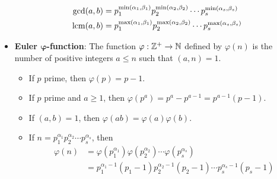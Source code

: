 \documentclass[../main.tex]{subfiles}
\begin{document}
\begin{itemize}
    \begin{align*}
        \gcd(a,b) &= p_1^{\min(\alpha_1,\beta_1)}p_2^{\min(\alpha_2,\beta_2)}\cdots p_s^{\min(\alpha_s,\beta_s)}\\
        \operatorname{lcm}(a,b) &= p_1^{\max(\alpha_1,\beta_1)}p_2^{\max(\alpha_2,\beta_2)}\cdots p_s^{\max(\alpha_s,\beta_s)}
    \end{align*}
    \item \textbf{Euler $\bm{\varphi}$-function}: The function $\varphi:\mathbb{Z}^+\to\mathbb{N}$ defined by $\varphi(n)$ is the number of positive integers $a\leq n$ such that $(a,n)=1$.
    \begin{itemize}
        \item If $p$ prime, then $\varphi(p)=p-1$.
        \item If $p$ prime and $a\geq 1$, then $\varphi(p^a)=p^a-p^{a-1}=p^{a-1}(p-1)$.
        \item If $(a,b)=1$, then $\varphi(ab)=\varphi(a)\varphi(b)$.
        \item If $n=p_1^{\alpha_1}p_2^{\alpha_2}\cdots p_s^{\alpha_s}$, then
        \begin{align*}
            \varphi(n) &= \varphi(p_1^{\alpha_1})\varphi(p_2^{\alpha_2})\cdots\varphi(p_s^{\alpha_s})\\
            &= p_1^{\alpha_1-1}(p_1-1)p_2^{\alpha_2-1}(p_2-1)\cdots p_s^{\alpha_s-1}(p_s-1)
        \end{align*}
    \end{itemize}
\end{itemize}
\end{document}
